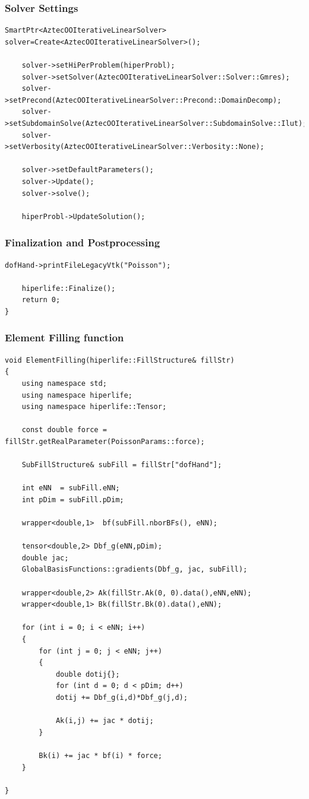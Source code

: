 \documentclass[]{article}
\begin{document}
\subsubsection{Solver Settings} \label{sec: slv}
\begin{lstlisting}[firstnumber=74]
	SmartPtr<AztecOOIterativeLinearSolver> solver=Create<AztecOOIterativeLinearSolver>();
	
	solver->setHiPerProblem(hiperProbl);
	solver->setSolver(AztecOOIterativeLinearSolver::Solver::Gmres);
	solver->setPrecond(AztecOOIterativeLinearSolver::Precond::DomainDecomp);
	solver->setSubdomainSolve(AztecOOIterativeLinearSolver::SubdomainSolve::Ilut);
	solver->setVerbosity(AztecOOIterativeLinearSolver::Verbosity::None);
	
	solver->setDefaultParameters();
	solver->Update();
	solver->solve();
	
	hiperProbl->UpdateSolution();
\end{lstlisting}

\subsubsection{Finalization and Postprocessing} \label{sec: fnl}
\begin{lstlisting}[firstnumber=87]
	dofHand->printFileLegacyVtk("Poisson");
		
	hiperlife::Finalize();
	return 0;
}
\end{lstlisting}

\subsubsection{Element Filling function} \label{sec: elff}
\begin{lstlisting}[firstnumber=92]
void ElementFilling(hiperlife::FillStructure& fillStr)
{
	using namespace std;
	using namespace hiperlife;
	using namespace hiperlife::Tensor;

	const double force = fillStr.getRealParameter(PoissonParams::force);
		
	SubFillStructure& subFill = fillStr["dofHand"];

	int eNN  = subFill.eNN;
	int pDim = subFill.pDim;
		
	wrapper<double,1>  bf(subFill.nborBFs(), eNN);
		
	tensor<double,2> Dbf_g(eNN,pDim);
	double jac;
	GlobalBasisFunctions::gradients(Dbf_g, jac, subFill);
		
	wrapper<double,2> Ak(fillStr.Ak(0, 0).data(),eNN,eNN);
	wrapper<double,1> Bk(fillStr.Bk(0).data(),eNN);
		
	for (int i = 0; i < eNN; i++)
	{
		for (int j = 0; j < eNN; j++)
		{
			double dotij{};
			for (int d = 0; d < pDim; d++)
			dotij += Dbf_g(i,d)*Dbf_g(j,d);
				
			Ak(i,j) += jac * dotij;
		}
			
		Bk(i) += jac * bf(i) * force;
	}
		
}
\end{lstlisting}
\end{document}
